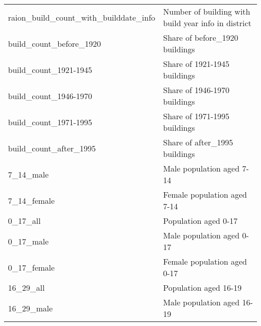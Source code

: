\begin{longtable}[c]{ll}
    raion\_build\_count\_with\_builddate\_info & Number of building with build year info in district                                                                       \\
    build\_count\_before\_1920                 & Share of before\_1920 buildings                                                                                           \\
    build\_count\_1921-1945                    & Share of 1921-1945 buildings                                                                                              \\
    build\_count\_1946-1970                    & Share of 1946-1970 buildings                                                                                              \\
    build\_count\_1971-1995                    & Share of 1971-1995 buildings                                                                                              \\
    build\_count\_after\_1995                  & Share of after\_1995 buildings                                                                                            \\
    7\_14\_male                                & Male population aged 7-14                                                                                                 \\
    7\_14\_female                              & Female population aged 7-14                                                                                               \\
    0\_17\_all                                 & Population aged 0-17                                                                                                      \\
    0\_17\_male                                & Male population aged 0-17                                                                                                 \\
    0\_17\_female                              & Female population aged 0-17                                                                                               \\
    16\_29\_all                                & Population aged 16-19                                                                                                     \\
    16\_29\_male                               & Male population aged 16-19                                                                                                \\

\end{longtable}
